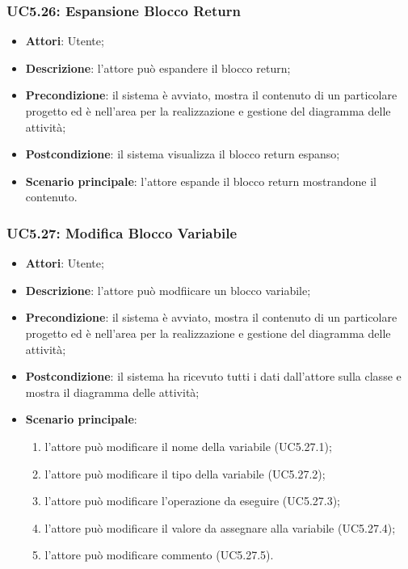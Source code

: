 \subsubsection{UC5.26: Espansione Blocco Return}
\label{UC5.26}
\begin{itemize}
	\item \textbf{Attori}: Utente;
	\item \textbf{Descrizione}: l'attore può espandere il blocco return;
	\item \textbf{Precondizione}: il sistema è avviato, mostra il contenuto di un particolare progetto ed è nell'area per la realizzazione e gestione del diagramma delle attività;
	\item \textbf{Postcondizione}: il sistema visualizza il blocco return espanso;
	\item \textbf{Scenario principale}: l'attore espande il blocco return mostrandone il contenuto.
\end{itemize}

\subsubsection{UC5.27: Modifica Blocco Variabile}
\label{UC5.27}
\begin{itemize}
	\item \textbf{Attori}: Utente;
	\item \textbf{Descrizione}: l'attore può modfiicare un blocco variabile;
	\item \textbf{Precondizione}: il sistema è avviato, mostra il contenuto di un particolare progetto ed è nell'area per la realizzazione e gestione del diagramma delle attività;
	\item \textbf{Postcondizione}: il sistema ha ricevuto tutti i dati dall'attore sulla classe e mostra il diagramma delle attività;
	\item \textbf{Scenario principale}:
	\begin{enumerate}
		\item l'attore può modificare il nome della variabile (UC5.27.1);
		\item l'attore può modificare il tipo della variabile (UC5.27.2);
		\item l'attore può modificare l'operazione da eseguire (UC5.27.3);
		\item l'attore può modificare il valore da assegnare alla variabile (UC5.27.4);
		\item l'attore può modificare commento (UC5.27.5).
	\end{enumerate}
\end{itemize}

